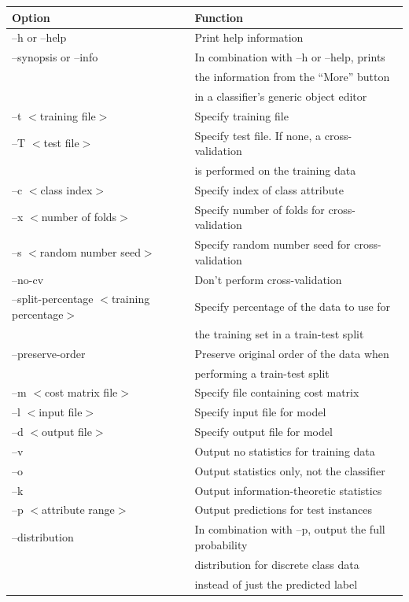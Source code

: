 \begin{table}[!thp]
\footnotesize
{\centering \begin{tabular}{ll}
\hline
Option & Function \\
\hline
--h or --help & Print help information \\
--synopsis or --info & In combination with --h or --help, prints \\
& the information from the ``More'' button \\
& in a classifier's generic object editor \\
--t $<$training file$>$ & Specify training file \\
--T $<$test file$>$ & Specify test file. If none, a cross-validation \\
& is performed on the training data \\
--c $<$class index$>$ & Specify index of class attribute \\
--x $<$number of folds$>$ & Specify number of folds for cross-validation \\
--s $<$random number seed$>$ & Specify random number seed for cross-validation \\
--no-cv & Don’t perform cross-validation \\
--split-percentage $<$training percentage$>$ & Specify percentage of the data to use for \\
& the training set in a train-test split \\
--preserve-order & Preserve original order of the data when \\ 
& performing a train-test split \\
--m $<$cost matrix file$>$ & Specify file containing cost matrix \\
--l $<$input file$>$ & Specify input file for model \\
--d $<$output file$>$ & Specify output file for model \\
--v & Output no statistics for training data \\
--o & Output statistics only, not the classifier \\ 
--k & Output information-theoretic statistics \\
--p $<$attribute range$>$ & Output predictions for test instances \\
--distribution & In combination with --p, output the full probability \\ 
& distribution for discrete class data \\
& instead of just the predicted label \\

\end{tabular}}
\end{table}
